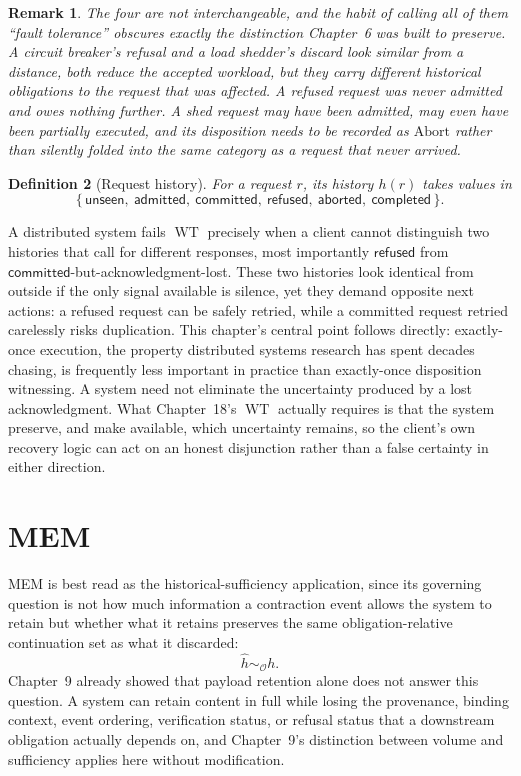\documentclass[11pt]{report}
\newtheorem{definition}{Definition}[chapter]
\newtheorem{remark}[definition]{Remark}
\newcommand{\Abort}{\mathrm{Abort}}
\begin{document}
\begin{remark}
The four are not interchangeable, and the habit of calling all of them ``fault tolerance'' obscures exactly the distinction Chapter~6 was built to preserve. A circuit breaker's refusal and a load shedder's discard look similar from a distance, both reduce the accepted workload, but they carry different historical obligations to the request that was affected. A refused request was never admitted and owes nothing further. A shed request may have been admitted, may even have been partially executed, and its disposition needs to be recorded as $\Abort$ rather than silently folded into the same category as a request that never arrived.
\end{remark}

\begin{definition}[Request history]
For a request $r$, its history $h(r)$ takes values in
\[
\{\, \mathsf{unseen},\ \mathsf{admitted},\ \mathsf{committed},\ \mathsf{refused},\ \mathsf{aborted},\ \mathsf{completed} \,\}.
\]
\end{definition}

A distributed system fails $\operatorname{WT}$ precisely when a client cannot distinguish two histories that call for different responses, most importantly $\mathsf{refused}$ from $\mathsf{committed}$-but-acknowledgment-lost. These two histories look identical from outside if the only signal available is silence, yet they demand opposite next actions: a refused request can be safely retried, while a committed request retried carelessly risks duplication. This chapter's central point follows directly: exactly-once execution, the property distributed systems research has spent decades chasing, is frequently less important in practice than exactly-once disposition witnessing. A system need not eliminate the uncertainty produced by a lost acknowledgment. What Chapter~18's $\operatorname{WT}$ actually requires is that the system preserve, and make available, which uncertainty remains, so the client's own recovery logic can act on an honest disjunction rather than a false certainty in either direction.

\chapter{MEM}

MEM is best read as the historical-sufficiency application, since its governing question is not how much information a contraction event allows the system to retain but whether what it retains preserves the same obligation-relative continuation set as what it discarded:
\[
\widehat h \sim_{\mathcal O} h.
\]
Chapter~9 already showed that payload retention alone does not answer this question. A system can retain content in full while losing the provenance, binding context, event ordering, verification status, or refusal status that a downstream obligation actually depends on, and Chapter~9's distinction between volume and sufficiency applies here without modification.
\end{document}
